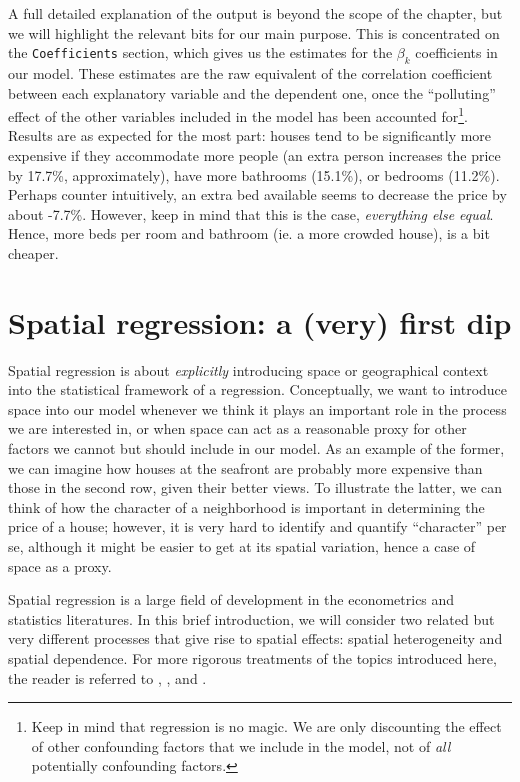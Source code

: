 \documentclass[
]{book}
\begin{document}
A full detailed explanation of the output is beyond the scope of the chapter, but we will highlight the relevant bits for our main purpose. This is concentrated on the \texttt{Coefficients} section, which gives us the estimates for the \(\beta_k\) coefficients in our model. These estimates are the raw equivalent of the correlation coefficient between each explanatory variable and the dependent one, once the ``polluting'' effect of the other variables included in the model has been accounted for\footnote{Keep in mind that regression is no magic. We are only discounting the effect of other confounding factors that we include in the model, not of \emph{all} potentially confounding factors.}. Results are as expected for the most part: houses tend to be significantly more expensive if they accommodate more people (an extra person increases the price by 17.7\%, approximately), have more bathrooms (15.1\%), or bedrooms (11.2\%). Perhaps counter intuitively, an extra bed available seems to decrease the price by about -7.7\%. However, keep in mind that this is the case, \emph{everything else equal}. Hence, more beds per room and bathroom (ie. a more crowded house), is a bit cheaper.

\hypertarget{spatial-regression-a-very-first-dip}{%
\section{Spatial regression: a (very) first dip}\label{spatial-regression-a-very-first-dip}}

Spatial regression is about \emph{explicitly} introducing space or geographical context into the statistical framework of a regression. Conceptually, we want to introduce space into our model whenever we think it plays an important role in the process we are interested in, or when space can act as a reasonable proxy for other factors we cannot but should include in our model. As an example of the former, we can imagine how houses at the seafront are probably more expensive than those in the second row, given their better views. To illustrate the latter, we can think of how the character of a neighborhood is important in determining the price of a house; however, it is very hard to identify and quantify ``character'' per se, although it might be easier to get at its spatial variation, hence a case of space as a proxy.

Spatial regression is a large field of development in the econometrics and statistics literatures. In this brief introduction, we will consider two related but very different processes that give rise to spatial effects: spatial heterogeneity and spatial dependence. For more rigorous treatments of the topics introduced here, the reader is referred to \citet{anselin2003spatial}, \citet{anselin2014modern}, and \citet{gibbons2014spatial}.
\end{document}
